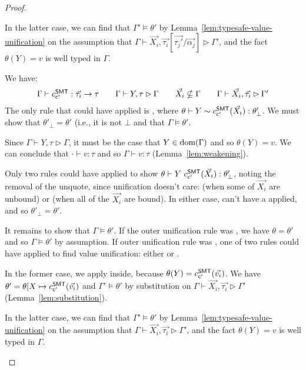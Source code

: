 \documentclass[acmsmall,screen,nonacm]{acmart}
\theoremstyle{definition}
\begin{document}
\begin{lemma}
\begin{proof}
\begin{proofcases}
  In the latter case, we can find that $\Gamma' \models \theta'$ by
  Lemma~\ref{lem:typesafe-value-unification} on the assumption that
  $\Gamma \vdash \vec{X_i}, \vec{\tau_i}[\vec{\tau_j'}/\vec{\alpha_j}] \rhd \Gamma'$,
  and the fact $\theta(Y) = v$ is well typed in $\Gamma$.

  \item[(\rn{$P$-EqSMT-BF})] We have:
%
  \[ \begin{array}{c}
    \Gamma \vdash c^\mathsf{SMT}_{\mathsf{c'}} : \vec{\tau_i} \rightarrow \tau \quad\quad
    \Gamma \vdash Y, \tau \rhd \Gamma \quad\quad
    \vec{X_i} \nsubseteq \Gamma \quad\quad
    \Gamma \vdash \vec{X_i}, \vec{\tau_i} \rhd \Gamma'
  \end{array} \]
%
  The only rule that could have applied is , where
  $\theta \vdash Y \sim c^\mathsf{SMT}_{\mathsf{c'}}(\vec{X_i}) : \theta'_\bot$. We must
  show that $\theta'_\bot = \theta'$ (i.e., it is not $\bot$ and that
  $\Gamma \models \theta'$.

  Since $\Gamma \vdash Y, \tau \rhd \Gamma$, it must be the case that
  $Y \in \mathrm{dom}(\Gamma)$ and so $\theta(Y) = v$. We can conclude that
  $\cdot \vdash v : \tau$ and so $\Gamma \vdash v : \tau$
  (Lemma~\ref{lem:weakening}).

  Only two rules could have applied to show $\theta \vdash Y
  ~ c^\mathsf{SMT}_{\mathsf{c'}}(\vec{X_i}) : \theta'_\bot$, noting the removal of the
  unquote, since unification doesn't care:  (when some of
  $\vec{X_i}$ are unbound) or  (when all of the
  $\vec{X_i}$ are bound). In either case,  can't have a
  applied, and so $\theta'_\bot = \theta'$.

  It remains to show that $\Gamma \models \theta'$. If the outer
  unification rule was , we have $\theta = \theta'$ and so
  $\Gamma \models \theta'$ by assumption.  If outer unification rule
  was , one of two rules could have applied to find value
  unification: either  or .

  In the former case, we apply  inside, because
  $\theta(Y) = c^\mathsf{SMT}_{\mathsf{c'}}(\vec{v_i})$. We have
  $\theta' = \theta[X \mapsto c^\mathsf{SMT}_{\mathsf{c'}}(\vec{v_i})$ and
  $\Gamma' \models \theta'$ by substitution on
  $\Gamma \vdash \vec{X_i}, \vec{\tau_i} \rhd \Gamma'$
  (Lemma~\ref{lem:substitution}).

  In the latter case, we can find that $\Gamma' \models \theta'$ by
  Lemma~\ref{lem:typesafe-value-unification} on the assumption that
  $\Gamma \vdash \vec{X_i}, \vec{\tau_i} \rhd \Gamma'$,
  and the fact $\theta(Y) = v$ is well typed in $\Gamma$.


\end{proofcases}
\end{proof}
\end{lemma}
\end{document}
